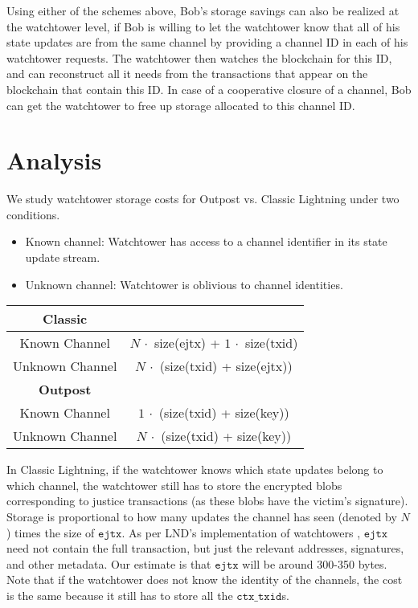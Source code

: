 Using either of the schemes above, Bob's storage savings can also be realized at the watchtower level, if Bob is willing to let the watchtower know that all of his state updates are from the same channel by providing a channel ID in each of his watchtower requests. The watchtower then watches the blockchain for this ID, and can reconstruct all it needs from the transactions that appear on the blockchain that contain this ID. In case of a cooperative closure of a channel, Bob can get the watchtower to free up storage allocated to this channel ID.

\section{Analysis}
\noindent
We study watchtower storage costs for Outpost vs. Classic Lightning under two conditions.
\begin{itemize}
    \item Known channel: Watchtower has access to a channel identifier in its state update stream.
    \item Unknown channel: Watchtower is oblivious to channel identities.
\end{itemize}

\begin{tabular}[b]{|c|c|}
\hline
              \textbf{Classic}  &           \\ \hline
Known Channel & $N\, \cdot$ size(ejtx) + $1\, \cdot$ size(txid) \\ \hline
Unknown Channel & $N\, \cdot$ (size(txid) + size(ejtx)) \\ \hline
               \textbf{Outpost}  &                 \\ \hline
Known Channel & $1\, \cdot$ (size(txid) + size(key)) \\ \hline
Unknown Channel & $N\, \cdot$ (size(txid) + size(key)) \\ \hline
\end{tabular}

In Classic Lightning, if the watchtower knows which state updates belong to which channel, the watchtower still has to store the encrypted blobs corresponding to justice transactions (as these blobs have the victim's signature). Storage is proportional to how many updates the channel has seen (denoted by $N$) times the size of $\texttt{ejtx}$. As per LND's implementation of watchtowers \cite{lnd_watchtower}, $\texttt{ejtx}$ need not contain the full transaction, but just the relevant addresses, signatures, and other metadata. Our estimate is that $\texttt{ejtx}$ will be around 300-350 bytes. Note that if the watchtower does not know the identity of the channels, the cost is the same because it still has to store all the $\texttt{ctx\_txid}$s.

